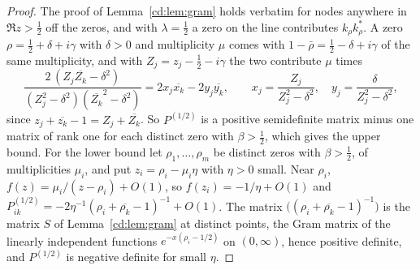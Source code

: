 \begin{proof}
The proof of Lemma~\ref{cd:lem:gram} holds verbatim for nodes anywhere in $\Re z>\tfrac12$ off the zeros, and with $\lambda=\tfrac12$ a zero on the line contributes $k_\rho k_\rho^*$. A zero $\rho=\tfrac12+\delta+i\gamma$ with $\delta>0$ and multiplicity $\mu$ comes with $1-\bar\rho=\tfrac12-\delta+i\gamma$ of the same multiplicity, and with $Z_j=z_j-\tfrac12-i\gamma$ the two contribute $\mu$ times
\[
\frac{2\,(Z_j\overline{Z_k}-\delta^2)}{(Z_j^2-\delta^2)(\overline{Z_k}^2-\delta^2)}=2x_j\overline{x_k}-2y_j\overline{y_k},\qquad x_j=\frac{Z_j}{Z_j^2-\delta^2},\quad y_j=\frac{\delta}{Z_j^2-\delta^2},
\]
since $z_j+\overline{z_k}-1=Z_j+\overline{Z_k}$. So $P^{(1/2)}$ is a positive semidefinite matrix minus one matrix of rank one for each distinct zero with $\beta>\tfrac12$, which gives the upper bound. For the lower bound let $\rho_1,\dots,\rho_m$ be distinct zeros with $\beta>\tfrac12$, of multiplicities $\mu_i$, and put $z_i=\rho_i-\mu_i\eta$ with $\eta>0$ small. Near $\rho_i$, $f(z)=\mu_i/(z-\rho_i)+O(1)$, so $f(z_i)=-1/\eta+O(1)$ and $P^{(1/2)}_{ik}=-2\eta^{-1}(\rho_i+\overline{\rho_k}-1)^{-1}+O(1)$. The matrix $\bigl((\rho_i+\overline{\rho_k}-1)^{-1}\bigr)$ is the matrix $S$ of Lemma~\ref{cd:lem:gram} at distinct points, the Gram matrix of the linearly independent functions $e^{-x(\rho_i-1/2)}$ on $(0,\infty)$, hence positive definite, and $P^{(1/2)}$ is negative definite for small $\eta$.
\end{proof}


